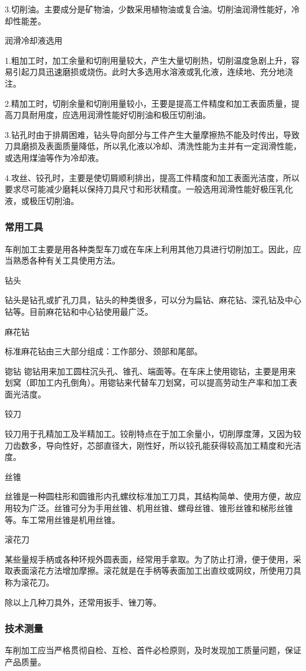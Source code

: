 \documentclass{ctexbook}
\begin{document}
3.切削油。主要成分是矿物油，少数采用植物油或复合油。切削油润滑性能好，冷却性能差。

润滑冷却液选用

1.粗加工时，加工余量和切削用量较大，产生大量切削热，切削温度急剧上升，容易引起刀具迅速磨损或烧伤。此时大多选用水溶液或乳化液，连续地、充分地浇注。

2.精加工时，切削余量和切削用量较小，王要是提高工件精度和加工表面质量，提高刀具耐用度，应选用润滑性能好切削油和极压切削油。

3.钻孔时由于排屑困难，钻头导向部分与工件产生大量摩擦热不能及时传出，导致刀具磨损及表面质量降低，所以乳化液以冷却、清洗性能为主并有一定润滑性能，或选用煤油等作为冷却液。

4.攻丝、铰孔时，主要是使切屑顺利排出，提高工件精度和加工表面光洁度，所以要求尽可能减少磨耗以保持刀具尺寸和形状精度。一般选用润滑性能好极压乳化液，或极压切削油。
\subsubsection{常用工具}
车削加工主要是用各种类型车刀或在车床上利用其他刀具进行切削加工。因此，应当熟悉各种有关工具使用方法。

钻头

钻头是钻孔或扩孔刀具，钻头的种类很多，可以分为扁钻、麻花钻、深孔钻及中心钻等。目前麻花钻和中心钻使用最广泛。

麻花钻

标准麻花钻由三大部分组成：工作部分、颈部和尾部。

锪钻 锪钻用来加工圆柱沉头孔、锥孔、端面等。在车床上使用锪钻，主要是用来划窝（即加工内孔倒角）。用锪钻来代替车刀划窝，可以提高劳动生产率和加工表面光洁度。

铰刀

铰刀用于孔精加工及半精加工。铰削特点在于加工余量小，切削厚度薄，又因为较刀齿数多，导向性好，芯部直径大，刚性好，所以铰孔能获得较高加工精度和光洁度。

丝锥

丝锥是一种圆柱形和圆锥形内孔螺纹标准加工刀具，其结构简单、使用方便，故应用较为广泛。丝锥可分为手用丝锥、机用丝锥、螺母丝锥、锥形丝锥和梯形丝锥等。车工常用丝锥是机用丝锥。

滚花刀

某些量规手柄或各种环规外圆表面，经常用手拿取。为了防止打滑，便于使用，采取表面滚花方法增加摩擦。滚花就是在手柄等表面加工出直纹或网纹，所使用刀具称为滚花刀。

除以上几种刀具外，还常用扳手、锉刀等。
\subsubsection{技术测量}
车削加工应当严格贯彻自检、互检、首件必检原则，及时发现加工质量问题，保证产品质量。
\end{document}
